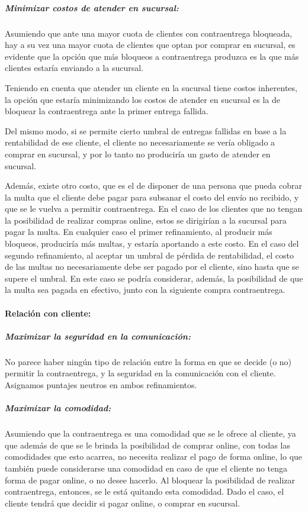 \subparagraph{Minimizar costos de atender en sucursal:}

Asumiendo que ante una mayor cuota de clientes con contraentrega bloqueada,
hay a su vez una mayor cuota de clientes que optan por comprar en sucursal, es
evidente que la opción que más bloqueos a contraentrega produzca es la que más
clientes estaría enviando a la sucursal.

Teniendo en cuenta que atender un cliente en la sucursal tiene costos
inherentes, la opción que estaría minimizando los costos de atender en
sucursal es la de bloquear la contraentrega ante la primer entrega fallida.

Del mismo modo, si se permite cierto umbral de entregas fallidas en base a la
rentabilidad de ese cliente, el cliente no necesariamente se vería obligado a
comprar en sucursal, y por lo tanto no produciría un gasto de atender en
sucursal.

Además, existe otro costo, que es el de disponer de una persona que pueda
cobrar la multa que el cliente debe pagar para subsanar el costo del envío no
recibido, y que se le vuelva a permitir contraentrega. En el caso de los
clientes que no tengan la posibilidad de realizar compras online, estos se
dirigirían a la sucursal para pagar la multa. En cualquier caso el primer
refinamiento, al producir más bloqueos, produciría más multas, y estaría
aportando a este costo. En el caso del segundo refinamiento, al aceptar un
umbral de pérdida de rentabilidad, el costo de las multas no necesariamente
debe ser pagado por el cliente, sino hasta que se supere el umbral. En este
caso se podría considerar, además, la posibilidad de que la multa sea pagada
en efectivo, junto con la siguiente compra contraentrega.

\paragraph{Relación con cliente:}

\subparagraph{Maximizar la seguridad en la comunicación:}

No parece haber ningún tipo de relación entre la forma en que se decide (o no)
permitir la contraentrega, y la seguridad en la comunicación con el cliente.
Asignamos puntajes neutros en ambos refinamientos.

\subparagraph{Maximizar la comodidad:}

Asumiendo que la contraentrega es una comodidad que se le ofrece al cliente,
ya que además de que se le brinda la posibilidad de comprar online, con todas
las comodidades que esto acarrea, no necesita realizar el pago de forma
online, lo que también puede considerarse una comodidad en caso de que el
cliente no tenga forma de pagar online, o no desee hacerlo. Al bloquear la
posibilidad de realizar contraentrega, entonces, se le está quitando esta
comodidad. Dado el caso, el cliente tendrá que decidir si pagar online, o
comprar en sucursal.

